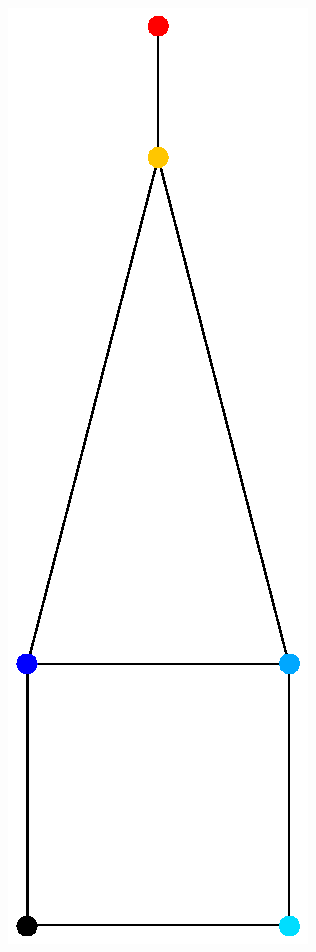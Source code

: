 \documentclass[12pt]{article}
\begin{document}
\begin{minipage}{0.2\textwidth}
\centerline{\includegraphics[width=\textwidth]{example1fpt.eps}}
\end{minipage}
\end{document}
